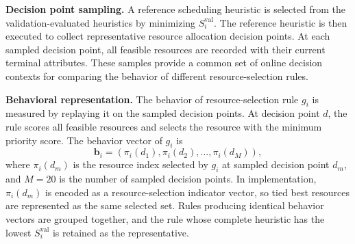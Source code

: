\documentclass[10pt,journal]{IEEEtran}
\begin{document}
\textbf{Decision point sampling.} A reference scheduling heuristic is selected from the validation-evaluated heuristics by minimizing $S_i^{\mathrm{val}}$. The reference heuristic is then executed to collect representative resource allocation decision points. At each sampled decision point, all feasible resources are recorded with their current terminal attributes. These samples provide a common set of online decision contexts for comparing the behavior of different resource-selection rules.

\textbf{Behavioral representation.} The behavior of resource-selection rule $g_i$ is measured by replaying it on the sampled decision points. At decision point $d$, the rule scores all feasible resources and selects the resource with the minimum priority score. The behavior vector of $g_i$ is
\begin{equation}
    \mathbf{b}_i = \left( \pi_i(d_1), \pi_i(d_2), \ldots, \pi_i(d_M) \right),
    \label{Eq: behavior vector}
\end{equation}
where $\pi_i(d_m)$ is the resource index selected by $g_i$ at sampled decision point $d_m$, and $M=20$ is the number of sampled decision points. In implementation, $\pi_i(d_m)$ is encoded as a resource-selection indicator vector, so tied best resources are represented as the same selected set. Rules producing identical behavior vectors are grouped together, and the rule whose complete heuristic has the lowest $S_i^{\mathrm{val}}$ is retained as the representative.
\end{document}
